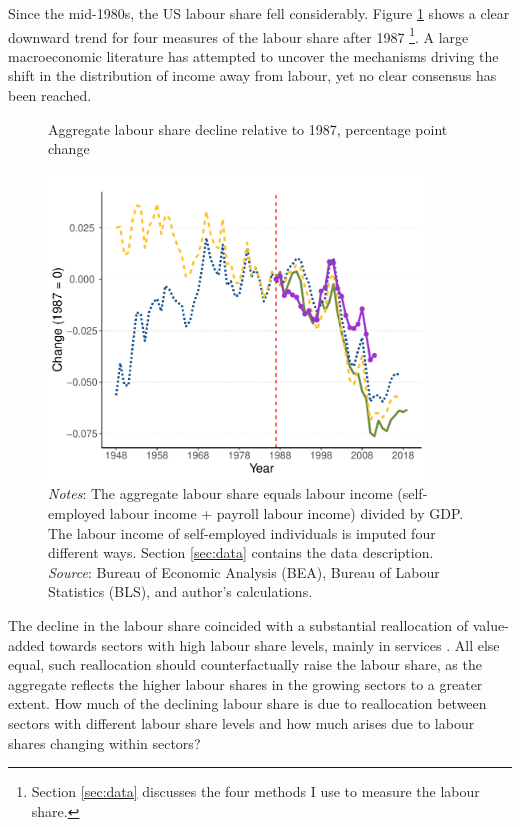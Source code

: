 Since the mid-1980s, the US labour share fell considerably. Figure \ref{fig:labour_shares} shows a clear downward trend for four measures of the labour share after 1987 \footnote{Section \ref{sec:data} discusses the four methods I use to measure the labour share.}. A large macroeconomic literature has attempted to uncover the mechanisms driving the shift in the distribution of income away from labour, yet no clear consensus has been reached.


\begin{figure}[h]
    \centering
    \caption{\normalsize Aggregate labour share decline relative to 1987, percentage point change}
    \includegraphics[width=10cm]{Introduction/diff_labour_shares.pdf}

    \label{fig:labour_shares}

\begin{minipage}{\linewidth}
    \caption*{\textit{Notes}: The aggregate labour share equals labour income (self-employed labour income + payroll labour income) divided by GDP. The labour income of self-employed individuals is imputed four different ways. Section \ref{sec:data} contains the data description. \\
    \textit{Source}: Bureau of Economic Analysis (BEA), Bureau of Labour Statistics (BLS), and author's calculations.}
\end{minipage}
\end{figure}

\noindent The decline in the labour share coincided with a substantial reallocation of value-added towards sectors with high labour share levels, mainly in services \citep{boppartStructuralChangeKaldor2014, herrendorfTwoPerspectivesPreferences2013, gagglStructuralChangeProduction2023, bridgmanLaborShareMarkups2023}. All else equal, such reallocation should counterfactually raise the labour share, as the aggregate reflects the higher labour shares in the growing sectors to a greater extent. How much of the declining labour share is due to reallocation between sectors with different labour share levels and how much arises due to labour shares changing within sectors? 

